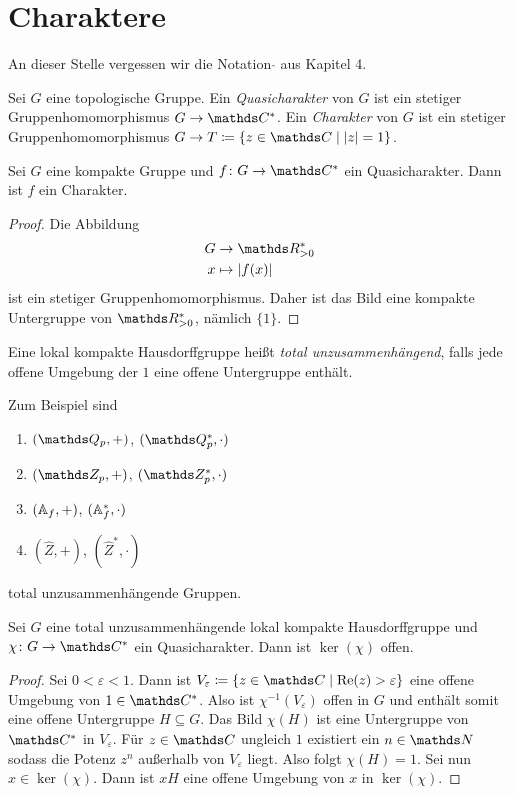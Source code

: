 \chapter{Charaktere}
An dieser Stelle vergessen wir die Notation $\hat{}$ aus Kapitel 4.
\begin{defi}
Sei $G$ eine topologische Gruppe.
Ein \emph{Quasicharakter} von $G$ ist ein stetiger Gruppenhomomorphismus $G \to \C^\ast$.
Ein \emph{Charakter} von $G$ ist ein stetiger Gruppenhomomorphismus $G\to T\coloneqq \{z \in \C \mid \abs{z}=1\}$.
\end{defi}

\begin{prop}
Sei $G$ eine kompakte Gruppe und $f \colon G \to \C^\ast$ ein Quasicharakter.
Dann ist $f$ ein Charakter.
\end{prop}
\begin{proof}
Die Abbildung
\begin{align*}
G &\to \R_{>0}^\ast\\
x&\mapsto \abs{f(x)}
\end{align*}
ist ein stetiger Gruppenhomomorphismus. Daher ist das Bild eine kompakte Untergruppe von $\R_{>0}^\ast$, nämlich $\{1\}$.
\end{proof}

\begin{defi}
Eine lokal kompakte Hausdorffgruppe heißt \emph{total unzusammenhängend}, falls jede offene Umgebung der $1$ eine offene Untergruppe enthält.
\end{defi}

\begin{bsp}
Zum Beispiel sind
\begin{enumerate}[label=\roman*)]
\item $(\Q_p,+)$, $(\Q_p^\ast,\cdot)$
\item $(\Z_p,+)$, $(\Z_p^\ast,\cdot)$
\item $(\mathbb{A}_f,+)$, $(\mathbb{A}_f^\ast,\cdot)$
\item $(\hat{Z},+)$, $(\hat{Z}^\ast,\cdot)$
\end{enumerate}
total unzusammenhängende Gruppen.
\end{bsp}

\begin{prop}
Sei $G$ eine total unzusammenhängende lokal kompakte Hausdorffgruppe und $\chi\colon G \to \C^\ast$ ein Quasicharakter.
Dann ist $\ker(\chi)$ offen.
\end{prop}
\begin{proof}
Sei $0<\varepsilon<1$. Dann ist $V_\varepsilon\coloneqq \{z\in \C \mid \Ret(z)>\varepsilon\}$ eine offene Umgebung von $1\in \C^\ast$.
Also ist $\chi^{-1}(V_\varepsilon)$ offen in $G$ und enthält somit eine offene Untergruppe $H \subseteq G$.
Das Bild $\chi(H)$ ist eine Untergruppe von $\C^\ast$ in $V_\varepsilon$.
Für $z\in \C$ ungleich $1$ existiert ein $n\in \N$ sodass die Potenz $z^n$ außerhalb von $V_\varepsilon$ liegt.
Also folgt $\chi(H)=1$.
Sei nun $x\in \ker(\chi)$. Dann ist $xH$ eine offene Umgebung von $x$ in $\ker(\chi)$.
\end{proof}

